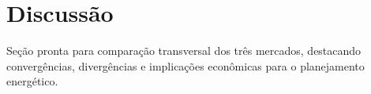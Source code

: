 \section{Discuss\~ao}

Se\c{c}\~ao pronta para compara\c{c}\~ao transversal dos tr\^es mercados, destacando converg\^encias, diverg\^encias e implica\c{c}\~oes econ\^omicas para o planejamento energ\'etico.

